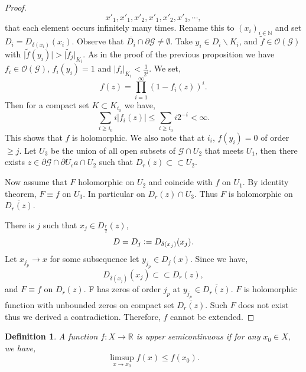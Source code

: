 \documentclass{article}
\newtheorem{definition}{Definition}[section]
\newcommand{\defeq}{\vcentcolon=}
\newcommand{\N}[0]{\mathbb{N}}
\newcommand{\R}[0]{\mathbb{R}}
\newcommand{\G}[0]{\mathcal{G}}
\newcommand{\bd}[0]{\partial}
\newcommand{\Ouv}[0]{\mathcal{O}}
\begin{document}
\begin{proof}
\begin{equation*}
    x'_1,x'_1,x'_2,x'_1,x'_2,x'_3,\cdots,
  \end{equation*}
  that each element occurs infinitely many times. Rename this to $(x_i)_{i\in\N}$ and set $D_i = D_{\delta(x_i)}(x_i)$. Observe that $\overline{D_i}\cap\bd\G\not=\emptyset$. 
  Take $y_i\in D_i\backslash K_i$, and $\tilde{f}\in\Ouv(\G)$ with $\vert\tilde{f}(y_i)\vert >\vert \tilde{f}_j\vert_{K_i}$. As in the proof of the previous proposition %
  we have $f_i\in\Ouv(\G)$, $f_i(y_i) = 1$ and $\vert f_i\vert_{K_i}<{\frac 1 {2^i}}$.
  We set,
  \begin{equation*}
    f(z) = \prod_{i=1}^\infty (1-f_i(z))^i.
  \end{equation*}
  Then for a compact set $K\subset K_{i_0}$ we have,
  \begin{equation*}
    \sum_{i\geq i_0}i\vert f_i(z)\vert \leq \sum_{i\geq i_0}i2^{-i}< \infty.
  \end{equation*}
  This shows that $f$ is holomorphic. We also note that at $i_i$, $f(y_i) = 0$ of order $\geq j$.
  Let $U_3$ be the union of all open subsets of $\G\cap U_2$ that meets $U_1$, then there exists $z\in\bd\G\cap\bd U_ca\cap U_2$ such that $D_r(z)\subset\subset U_2$. 
  \par Now assume that $F$ holomorphic on $U_2$ and coincide with $f$ on $U_1$. By identity theorem, $F\equiv f $ on $U_3$. In particular on $D_r(z)\cap U_3$. Thus $F$ is holomorphic on $\overline{D_r(z)}$.
  \par There is $j$ such that $x_j\in D_{{\frac r 2}}(z)$,
  \begin{equation*}
    D = D_j \defeq D_{\delta(x_j)}(x_j).
  \end{equation*}
  Let $x_{j_p}\to x$ for some subsequence let $y_{j_p}\in D_j(x)$. Since we have,
  \begin{equation*}
    D_{\delta(x_j)}(x_j)\subset\subset D_r(z),
  \end{equation*}
  and $F\equiv f$ on $D_r(z)$. F has zeros of order $j_p$ at $y_{j_p}\in\overline{D_r(z)}$. $F$ is holomorphic function with unbounded zeros on compact set $\overline{D_r(z)}$. Such $F$ does not exist thus we derived a contradiction. Therefore, $f$ cannot be extended.
\end{proof}
\begin{definition}
  A function $f:X\to\R$ is upper semicontinuous if for any $x_0\in X$, we have,
  \begin{equation*}
    \limsup_{x\to x_0}f(x)\leq f(x_0).
  \end{equation*}
\end{definition}
\end{document}

